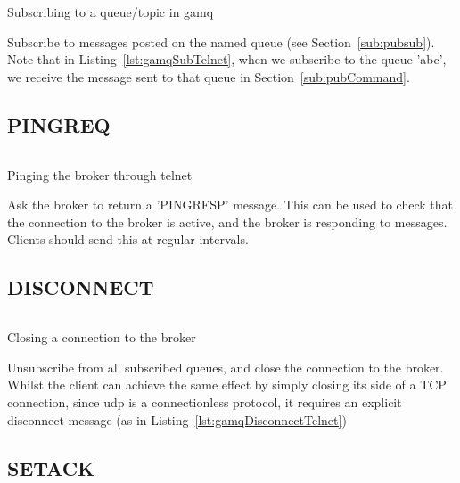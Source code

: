 \begin{listing}[H]
  \centering
  \inputminted{bash}{code/gamqSubOutput}
  \caption{Subscribing to a queue/topic in gamq}
  \label{lst:gamqSubTelnet}
\end{listing}

Subscribe to messages posted on the named queue (see Section~\ref{sub:pubsub}).
Note that in Listing~\ref{lst:gamqSubTelnet}, when we subscribe to the queue
'abc', we receive the message sent to that queue in
Section~\ref{sub:pubCommand}.

\subsection{PINGREQ}
\label{sub:pingreqCommand}

\begin{listing}[H]
  \centering
  \inputminted{bash}{code/gamqPingreqOutput}
  \caption{Pinging the broker through telnet}
  \label{lst:gamqPingreqTelnet}
\end{listing}

Ask the broker to return a 'PINGRESP' message. This can be used to check that
the connection to the broker is active, and the broker is responding to
messages. Clients should send this at regular intervals.

\subsection{DISCONNECT}
\label{sub:disconnectCommand}

\begin{listing}[H]
  \centering
  \inputminted{bash}{code/gamqDisconnectOutput}
  \caption{Closing a connection to the broker}
  \label{lst:gamqDisconnectTelnet}
\end{listing}

Unsubscribe from all subscribed queues, and close the connection to the broker.
Whilst the client can achieve the same effect by simply closing its side of a
TCP connection, since \gls{udp} is a connectionless protocol, it
requires an explicit disconnect message (as in
Listing~\ref{lst:gamqDisconnectTelnet})

\subsection{SETACK}
\label{sub:setackCommand}

